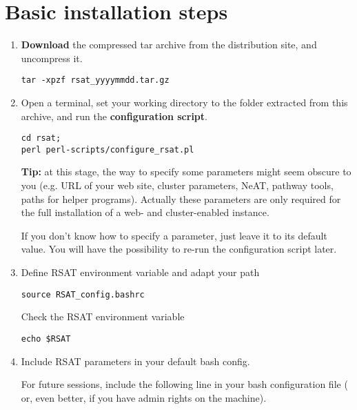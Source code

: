 \documentclass[12pt,a4paper, oneside]{scrreprt} %
\begin{document}
\section{Basic installation steps}


\begin{enumerate}
\item \textbf{Download} the compressed tar archive from the \RSAT
  distribution site, and uncompress it.

  \begin{lstlisting}
tar -xpzf rsat_yyyymmdd.tar.gz
  \end{lstlisting}
  
  
\item Open a terminal, set your working directory to the 
  folder extracted from this archive, and run the \RSAT
  \textbf{configuration script}.

  \begin{lstlisting}
cd rsat; 
perl perl-scripts/configure_rsat.pl
  \end{lstlisting}

  \textbf{Tip:} at this stage, the way to specify some parameters
  might seem obscure to you (e.g. URL of your web site, cluster
  parameters, NeAT, pathway tools, paths for helper
  programs). Actually these parameters are only required for the full
  installation of a web- and cluster-enabled \RSAT instance. 

  If you don't know how to specify a parameter, just leave it to its
  default value. You will have the possibility to re-run the
  configuration script later.

\item Define RSAT environment variable and adapt your path

  \begin{lstlisting}
source RSAT_config.bashrc
  \end{lstlisting}

Check the RSAT environment variable

  \begin{lstlisting}
echo $RSAT
  \end{lstlisting}

\item Include RSAT parameters in your default bash config.

For future sessions, include the following line in your bash
configuration file ( or, even better,
 if you have admin rights on the machine).


\end{enumerate}
\end{document}
